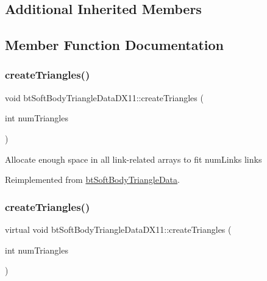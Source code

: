 \subsection*{Additional Inherited Members}


\subsection{Member Function Documentation}
\mbox{\label{classbtSoftBodyTriangleDataDX11_a91fd155f00fac9ce8330f62b5fd4a26b}} 
\subsubsection{\texorpdfstring{create\+Triangles()}{createTriangles()}\hspace{0.1cm}{\footnotesize\ttfamily [1/2]}}
{\footnotesize\ttfamily void bt\+Soft\+Body\+Triangle\+Data\+D\+X11\+::create\+Triangles (\begin{DoxyParamCaption}\item[{int}]{num\+Triangles }\end{DoxyParamCaption})\hspace{0.3cm}{\ttfamily [virtual]}}

Allocate enough space in all link-\/related arrays to fit num\+Links links 

Reimplemented from \hyperlink{classbtSoftBodyTriangleData}{bt\+Soft\+Body\+Triangle\+Data}.

\mbox{\label{classbtSoftBodyTriangleDataDX11_a0d97c5cd5e8f4d98f4d613038c239d26}} 
\subsubsection{\texorpdfstring{create\+Triangles()}{createTriangles()}\hspace{0.1cm}{\footnotesize\ttfamily [2/2]}}
{\footnotesize\ttfamily virtual void bt\+Soft\+Body\+Triangle\+Data\+D\+X11\+::create\+Triangles (\begin{DoxyParamCaption}\item[{int}]{num\+Triangles }\end{DoxyParamCaption})\hspace{0.3cm}{\ttfamily [virtual]}}

